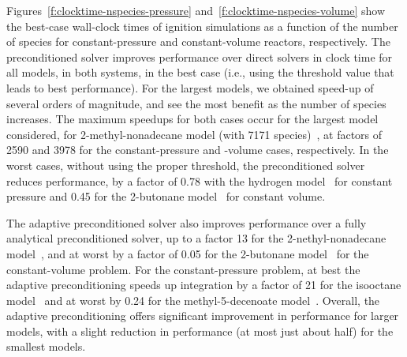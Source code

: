 \documentclass[twocolumn,10pt]{article}
\newcommand{\revised}[2]{#1}  %
\begin{document}
\revised{Figures~\ref{f:clocktime-nspecies-pressure} and~\ref{f:clocktime-nspecies-volume} show the best-case wall-clock times of ignition simulations as a function of the number of species for constant-pressure and constant-volume reactors, respectively.
The preconditioned solver improves performance over direct solvers in clock time for all models, in both systems, in the best case (i.e., using the threshold value that leads to best performance). 
For the largest models, we obtained speed-up of several orders of magnitude, and see the most benefit as the number of species increases. 
The maximum speedups for both cases occur for the largest model considered, for 2-methyl-nonadecane model (with 7171 species)~\cite{sarathy_comprehensive_2011}, at factors of 2590 and 3978 for the constant-pressure and -volume cases, respectively.
In the worst cases, without using the proper threshold, the preconditioned solver reduces performance, by a factor of 0.78 with the hydrogen model~\cite{smith_gri-mech_1999} for constant pressure and 0.45 for the 2-butonane model~\cite{hemken_2017} for constant volume.
}{revOne} 

\revised{The adaptive preconditioned solver also improves performance over a fully analytical preconditioned solver, up to a factor 13 for the 2-nethyl-nonadecane model~\cite{sarathy_comprehensive_2011}, and at worst by a factor of 0.05 for the 2-butonane model~\cite{hemken_2017} for the constant-volume problem. 
For the constant-pressure problem, at best the adaptive preconditioning speeds up integration by a factor of 21 for the isooctane model~\cite{mehl_chemical_2009} and at worst by 0.24 for the methyl-5-decenoate model~\cite{herbinet_detailed_2010}.
Overall, the adaptive preconditioning offers significant improvement in performance for larger models, with a slight reduction in performance (at most just about half) for the smallest models.}{revOne} 
\end{document}
